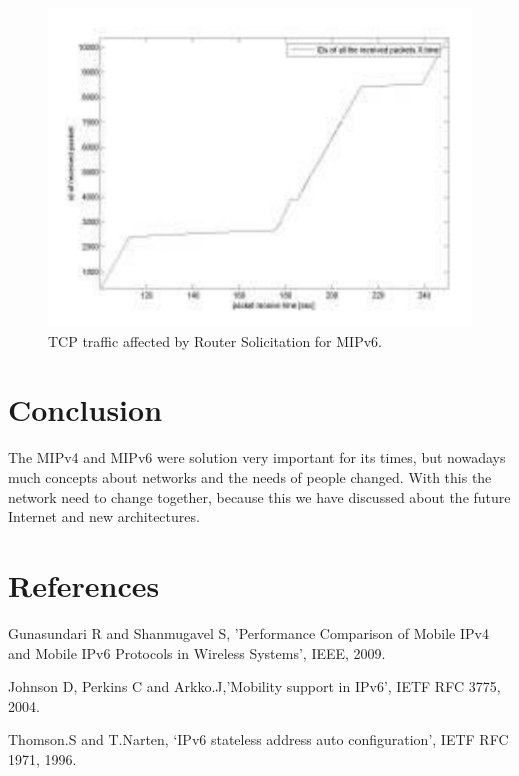 \documentclass[12pt]{article}
\begin{document}
\begin{figure}[ht]
\centering
\includegraphics[width=.3\textwidth]{topico3_mipv6.png}
\caption{TCP traffic affected by Router Solicitation for MIPv6.}
\label{fig:topico2_mipv6}
\end{figure}


\section{Conclusion}

The MIPv4 and MIPv6 were solution very important for its times, but nowadays much concepts about networks and the needs of people changed. With this the network need to change together, because this we have discussed about the future Internet and new architectures.



\section{References}
Gunasundari R and Shanmugavel S, 'Performance Comparison of Mobile IPv4 and Mobile IPv6 Protocols in Wireless Systems', IEEE, 2009.

Johnson D, Perkins C and Arkko.J,’Mobility support in IPv6', IETF RFC 3775, 2004.

Thomson.S and T.Narten, ‘IPv6 stateless address auto configuration’, IETF  RFC 1971, 1996.




\end{document}

